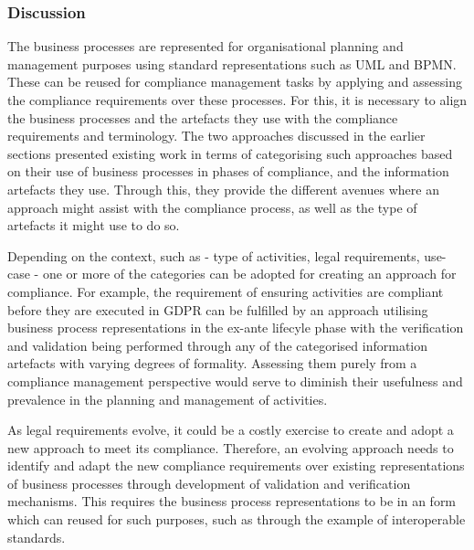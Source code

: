 \subsubsection*{Discussion}
The business processes are represented for organisational planning and management purposes using standard representations such as UML and BPMN. These can be reused for compliance management tasks by applying and assessing the compliance requirements over these processes. For this, it is necessary to align the business processes and the artefacts they use with the compliance requirements and terminology. The two approaches discussed in the earlier sections presented existing work in terms of categorising such approaches based on their use of business processes in phases of compliance, and the information artefacts they use. Through this, they provide the different avenues where an approach might assist with the compliance process, as well as the type of artefacts it might use to do so.

Depending on the context, such as - type of activities, legal requirements, use-case - one or more of the categories can be adopted for creating an approach for compliance. For example, the requirement of ensuring activities are compliant before they are executed in GDPR can be fulfilled by an approach utilising business process representations in the ex-ante lifecyle phase with the verification and validation being performed through any of the categorised information artefacts with varying degrees of formality. Assessing them purely from a compliance management perspective would serve to diminish their usefulness and prevalence in the planning and management of activities.

As legal requirements evolve, it could be a costly exercise to create and adopt a new approach to meet its compliance. Therefore, an evolving approach needs to identify and adapt the new compliance requirements over existing representations of business processes through development of validation and verification mechanisms.
This requires the business process representations to be in an form which can reused for such purposes, such as through the example of interoperable standards.

